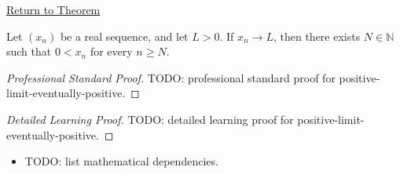 \newpage
{}
\label{prf:positive-limit-eventually-positive}

\begin{remark*}[Return]
\hyperref[thm:positive-limit-eventually-positive]{Return to Theorem}
\end{remark*}

\begin{theorem*}
Let $(x_n)$ be a real sequence, and let $L>0$. If $x_n\to L$, then there
exists $N\in\mathbb{N}$ such that $0<x_n$ for every $n\ge N$.

\smallskip
\noindent
\end{theorem*}

\begin{proof}[Professional Standard Proof]
\LRAProofBodyStart
TODO: professional standard proof for positive-limit-eventually-positive.
\end{proof}

\begin{proof}[Detailed Learning Proof]
\LRAProofBodyStart
TODO: detailed learning proof for positive-limit-eventually-positive.
\end{proof}

\begin{remark*}
\end{remark*}

\begin{dependencies}
\begin{itemize}
  \item TODO: list mathematical dependencies.
\end{itemize}
\end{dependencies}

\clearpage
